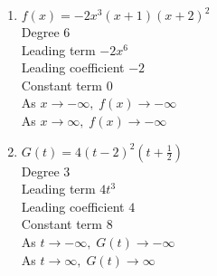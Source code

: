 \documentclass{ximera}
\begin{document}
\pagebreak

\begin{enumerate}
\setcounter{enumi}{\value{HW}}

\item $f(x) = -2x^3(x+1)(x+2)^2$ \\
Degree 6 \\
Leading term $-2x^{6}$\\
Leading coefficient $-2$\\
Constant term $0$\\
As $x \rightarrow -\infty, \; f(x) \rightarrow -\infty$\\
As $x \rightarrow \infty, \; f(x) \rightarrow -\infty$\\

\item $G(t) = 4(t-2)^2\left(t+\frac{1}{2}\right)$ \\
Degree 3 \\
Leading term $4t^3$\\
Leading coefficient $4$\\
Constant term $8$\\
As $t \rightarrow -\infty, \; G(t) \rightarrow -\infty$\\
As $t \rightarrow \infty, \; G(t) \rightarrow \infty$\\

\setcounter{HW}{\value{enumi}}
\end{enumerate}
\end{document}
